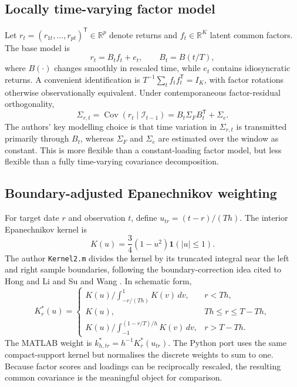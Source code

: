 \documentclass[11pt,a4paper]{article}
\newcommand{\R}{\mathbb{R}}
\newcommand{\Cov}{\operatorname{Cov}}
\newcommand{\trans}{^{\mathsf T}}
\newcommand{\code}[1]{\texttt{#1}}
\begin{document}
\subsection{Locally time-varying factor model}

Let $r_t=(r_{1t},\ldots,r_{pt})\trans\in\R^p$ denote returns and $f_t\in\R^K$ latent common factors. The base model is
\begin{equation}
 r_t=B_t f_t+e_t,
 \qquad B_t=B(t/T),
 \label{eq:factor-model}
\end{equation}
where $B(\cdot)$ changes smoothly in rescaled time, while $e_t$ contains idiosyncratic returns. A convenient identification is $T^{-1}\sum_t f_tf_t\trans=I_K$, with factor rotations otherwise observationally equivalent. Under contemporaneous factor-residual orthogonality,
\begin{equation}
 \Sigma_{r,t}=\Cov(r_t\mid\mathcal I_{t-1})
 =B_t\Sigma_F B_t\trans+\Sigma_e.
 \label{eq:population-factor-cov}
\end{equation}
The authors' key modelling choice is that time variation in $\Sigma_{r,t}$ is transmitted primarily through $B_t$, whereas $\Sigma_F$ and $\Sigma_e$ are estimated over the window as constant. This is more flexible than a constant-loading factor model, but less flexible than a fully time-varying covariance decomposition.

\subsection{Boundary-adjusted Epanechnikov weighting}

For target date $r$ and observation $t$, define $u_{tr}=(t-r)/(Th)$. The interior Epanechnikov kernel is
\begin{equation}
 K(u)=\frac34(1-u^2)\mathbf 1(|u|\le1).
\end{equation}
The author \code{Kernel2.m} divides the kernel by its truncated integral near the left and right sample boundaries, following the boundary-correction idea cited to Hong and Li and Su and Wang \cite{hongli2005,suwang2017}. In schematic form,
\begin{equation}
 K^*_{r}(u)=
 \begin{cases}
 K(u)\big/\int_{-r/(Th)}^1K(v)\,dv,&r<Th,\\
 K(u),&Th\le r\le T-Th,\\
 K(u)\big/\int_{-1}^{(1-r/T)/h}K(v)\,dv,&r>T-Th.
 \end{cases}
\end{equation}
The MATLAB weight is $k^*_{h,tr}=h^{-1}K_r^*(u_{tr})$. The Python port uses the same compact-support kernel but normalises the discrete weights to sum to one. Because factor scores and loadings can be reciprocally rescaled, the resulting common covariance is the meaningful object for comparison.
\end{document}
